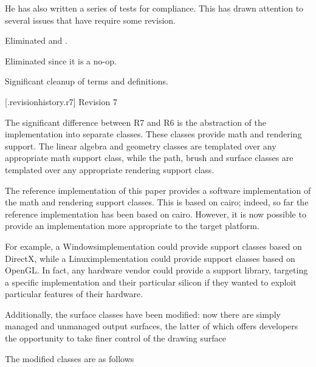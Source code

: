 \pnum
He has also written a series of tests for compliance. This has drawn attention to several issues that have require some revision.

\pnum
Eliminated  and .

\pnum
Eliminated  since it is a no-op.

\pnum
Significant cleanup of terms and definitions.

 [\iotwod.revisionhistory.r7] {Revision 7}

\pnum
The significant difference between R7 and R6 is the abstraction of the implementation into separate classes. These classes provide math and rendering support. The linear algebra and geometry classes are templated over any appropriate math support class, while the path, brush and surface classes are templated over any appropriate rendering support class.

\pnum
The reference implementation of this paper provides a software implementation of the math and rendering support classes. This is based on cairo; indeed, so far the reference implementation has been based on cairo. However, it is now possible to provide an implementation more appropriate to the target platform.

\pnum
For example, a Windows\textregistered implementation could provide support classes based on DirectX\textregistered, while a Linux\textregistered implementation could provide support classes based on OpenGL\textregistered. In fact, any hardware vendor could provide a support library, targeting a specific implementation and their particular silicon if they wanted to exploit particular features of their hardware.

\pnum
Additionally, the surface classes have been modified: now there are simply managed and unmanaged output surfaces, the latter of which offers developers the opportunity to take finer control of the drawing surface

\pnum
The modified classes are as follows

